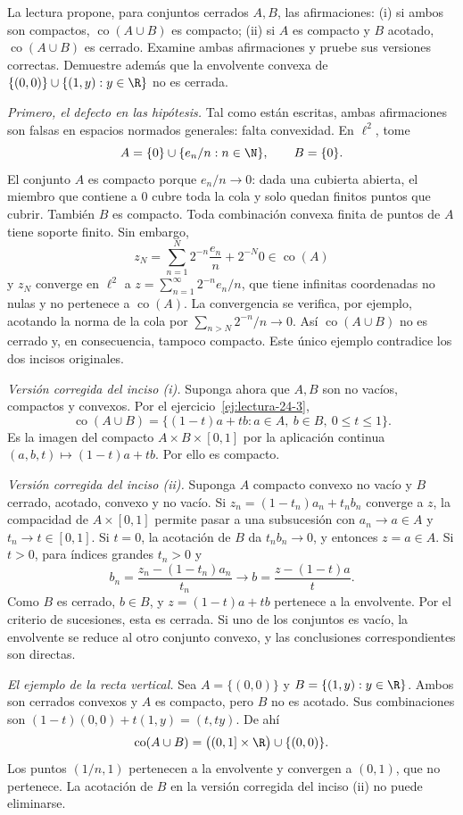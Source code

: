 \begin{ejercicio}\label{ej:lectura-24-4}
La lectura propone, para conjuntos cerrados $A,B$, las afirmaciones: (i) si ambos son compactos, $\operatorname{co}(A\cup B)$ es compacto; (ii) si $A$ es compacto y $B$ acotado, $\operatorname{co}(A\cup B)$ es cerrado. Examine ambas afirmaciones y pruebe sus versiones correctas. Demuestre además que la envolvente convexa de $\{(0,0)\}\cup\{(1,y):y\in\R\}$ no es cerrada.
\end{ejercicio}
\begin{solucion}
\emph{Primero, el defecto en las hipótesis.} Tal como están escritas, ambas afirmaciones son falsas en espacios normados generales: falta convexidad. En $\ell^2$, tome
\[
 A=\{0\}\cup\{e_n/n:n\in\N\},\qquad B=\{0\}.
\]
El conjunto $A$ es compacto porque $e_n/n\to0$: dada una cubierta abierta, el miembro que contiene a $0$ cubre toda la cola y solo quedan finitos puntos que cubrir. También $B$ es compacto. Toda combinación convexa finita de puntos de $A$ tiene soporte finito. Sin embargo,
\[
 z_N=\sum_{n=1}^N2^{-n}\frac{e_n}{n}+2^{-N}0
 \in\operatorname{co}(A)
\]
y $z_N$ converge en $\ell^2$ a $z=\sum_{n=1}^{\infty}2^{-n}e_n/n$, que tiene infinitas coordenadas no nulas y no pertenece a $\operatorname{co}(A)$. La convergencia se verifica, por ejemplo, acotando la norma de la cola por $\sum_{n>N}2^{-n}/n\to0$. Así $\operatorname{co}(A\cup B)$ no es cerrado y, en consecuencia, tampoco compacto. Este único ejemplo contradice los dos incisos originales.

\emph{Versión corregida del inciso (i).} Suponga ahora que $A,B$ son no vacíos, compactos y convexos. Por el ejercicio~\ref{ej:lectura-24-3},
\[
 \operatorname{co}(A\cup B)
 =\{(1-t)a+tb:a\in A,\ b\in B,\ 0\leq t\leq1\}.
\]
Es la imagen del compacto $A\times B\times[0,1]$ por la aplicación continua $(a,b,t)\mapsto(1-t)a+tb$. Por ello es compacto.

\emph{Versión corregida del inciso (ii).} Suponga $A$ compacto convexo no vacío y $B$ cerrado, acotado, convexo y no vacío. Si $z_n=(1-t_n)a_n+t_nb_n$ converge a $z$, la compacidad de $A\times[0,1]$ permite pasar a una subsucesión con $a_n\to a\in A$ y $t_n\to t\in[0,1]$. Si $t=0$, la acotación de $B$ da $t_nb_n\to0$, y entonces $z=a\in A$. Si $t>0$, para índices grandes $t_n>0$ y
\[
 b_n=\frac{z_n-(1-t_n)a_n}{t_n}
 \longrightarrow b=\frac{z-(1-t)a}{t}.
\]
Como $B$ es cerrado, $b\in B$, y $z=(1-t)a+tb$ pertenece a la envolvente. Por el criterio de sucesiones, esta es cerrada. Si uno de los conjuntos es vacío, la envolvente se reduce al otro conjunto convexo, y las conclusiones correspondientes son directas.

\emph{El ejemplo de la recta vertical.} Sea $A=\{(0,0)\}$ y $B=\{(1,y):y\in\R\}$. Ambos son cerrados convexos y $A$ es compacto, pero $B$ no es acotado. Sus combinaciones son $(1-t)(0,0)+t(1,y)=(t,ty)$. De ahí
\[
 \operatorname{co}(A\cup B)
 =\bigl((0,1]\times\R\bigr)\cup\{(0,0)\}.
\]
Los puntos $(1/n,1)$ pertenecen a la envolvente y convergen a $(0,1)$, que no pertenece. La acotación de $B$ en la versión corregida del inciso (ii) no puede eliminarse.
\end{solucion}

